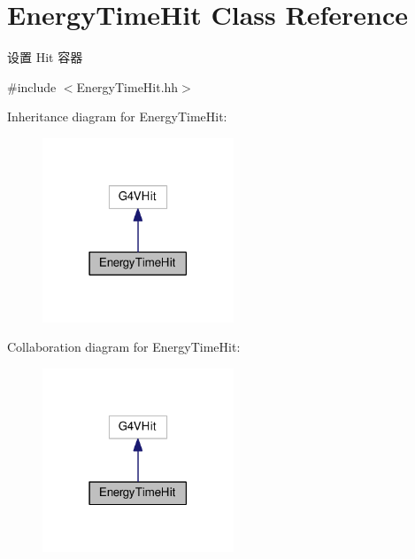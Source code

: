 \hypertarget{classEnergyTimeHit}{}\section{Energy\+Time\+Hit Class Reference}
\label{classEnergyTimeHit}


设置 Hit 容器  




{\ttfamily \#include $<$Energy\+Time\+Hit.\+hh$>$}



Inheritance diagram for Energy\+Time\+Hit\+:\nopagebreak
\begin{figure}[H]
\begin{center}
\leavevmode
\includegraphics[width=162pt]{classEnergyTimeHit__inherit__graph}
\end{center}
\end{figure}


Collaboration diagram for Energy\+Time\+Hit\+:\nopagebreak
\begin{figure}[H]
\begin{center}
\leavevmode
\includegraphics[width=162pt]{classEnergyTimeHit__coll__graph}
\end{center}
\end{figure}
